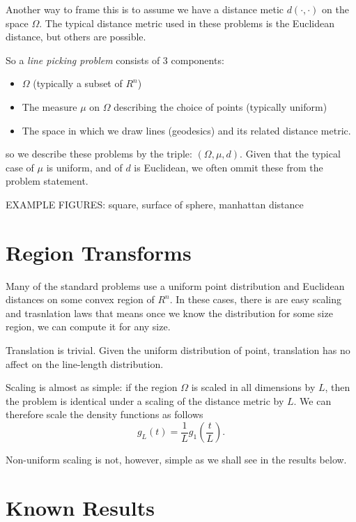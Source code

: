 \documentclass{article}
\begin{document}
Another way to frame this is to assume we have a distance metic
$d(\cdot, \cdot)$ on the space $\Omega$. The typical distance metric
used in these problems is the Euclidean distance, but others are
possible.

So a {\em line picking problem} consists of 3 components:
\begin{itemize}

\item $\Omega$ (typically a subset of $R^n$)

\item The measure $\mu$ on $\Omega$ describing the choice of points
  (typically uniform)

\item The space in which we draw lines (geodesics) and its related
  distance metric.

\end{itemize}
so we describe these problems by the triple: $(\Omega, \mu, d)$. Given
that the typical case of $\mu$ is uniform, and of $d$ is Euclidean, we
often ommit these from the problem statement.

EXAMPLE FIGURES: square, surface of sphere, manhattan distance


\section{Region Transforms}
\label{sec:scaling}

Many of the standard problems use a uniform point distribution and
Euclidean distances on some convex region of $R^n$. In these cases,
there is are easy scaling and trasnlation laws that means once we know
the distribution for some size region, we can compute it for any size.

Translation is trivial. Given the uniform distribution of point,
translation has no affect on the line-length distribution.

Scaling is almost as simple: if the region $\Omega$ is scaled in all
dimensions by $L$, then the problem is identical under a scaling of
the distance metric by $L$. We can therefore scale the density
functions as follows
\[ g_L(t) = \frac{1}{L} g_1\left(\frac{t}{L} \right). \]



Non-uniform scaling is not, however, simple as we shall see in the
results below.


\section{Known Results}
\label{sec:known}
\end{document}
